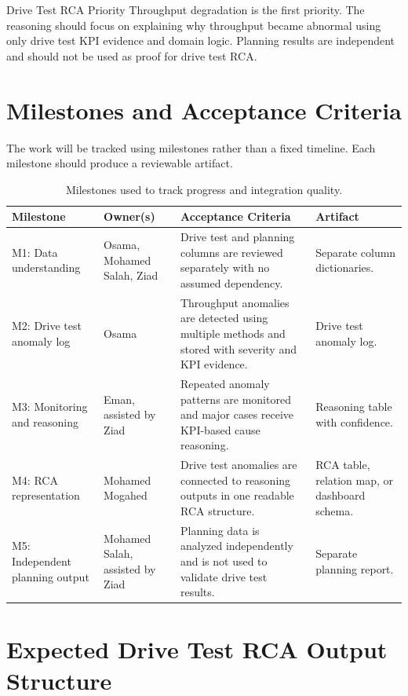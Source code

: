 \documentclass[12pt,a4paper]{article}
\begin{document}
\begin{successbox}{Drive Test RCA Priority}
Throughput degradation is the first priority. The reasoning should focus on explaining why throughput became abnormal using only drive test KPI evidence and domain logic. Planning results are independent and should not be used as proof for drive test RCA.
\end{successbox}

\section{Milestones and Acceptance Criteria}

The work will be tracked using milestones rather than a fixed timeline. Each milestone should produce a reviewable artifact.

\begin{table}[H]
\centering
\scriptsize
\begin{tabularx}{\textwidth}{P{2.45cm}P{2.75cm}Y Y}
\toprule
\textbf{Milestone} & \textbf{Owner(s)} & \textbf{Acceptance Criteria} & \textbf{Artifact} \\
\midrule
M1: Data understanding & Osama, Mohamed Salah, Ziad & Drive test and planning columns are reviewed separately with no assumed dependency. & Separate column dictionaries. \\
\midrule
M2: Drive test anomaly log & Osama & Throughput anomalies are detected using multiple methods and stored with severity and KPI evidence. & Drive test anomaly log. \\
\midrule
M3: Monitoring and reasoning & Eman, assisted by Ziad & Repeated anomaly patterns are monitored and major cases receive KPI-based cause reasoning. & Reasoning table with confidence. \\
\midrule
M4: RCA representation & Mohamed Mogahed & Drive test anomalies are connected to reasoning outputs in one readable RCA structure. & RCA table, relation map, or dashboard schema. \\
\midrule
M5: Independent planning output & Mohamed Salah, assisted by Ziad & Planning data is analyzed independently and is not used to validate drive test results. & Separate planning report. \\
\bottomrule
\end{tabularx}
\caption{Milestones used to track progress and integration quality.}
\end{table}

\section{Expected Drive Test RCA Output Structure}
\end{document}
